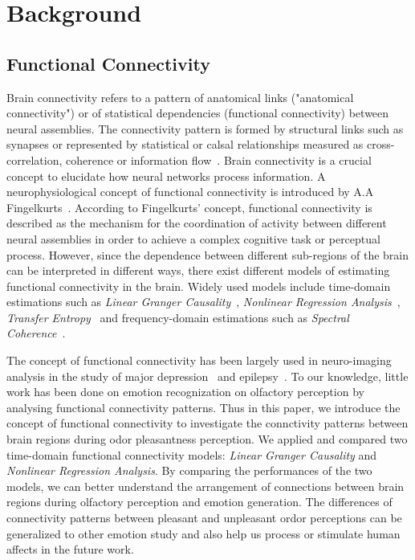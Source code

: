 \section{Background}

\subsection{Functional Connectivity}
Brain connectivity refers to a pattern of anatomical links ("anatomical connectivity") or of statistical dependencies (functional connectivity) between neural assemblies. The connectivity pattern is formed by structural links such as synapses or represented by statistical or calsal relationships measured as cross-correlation, coherence or information flow~\cite{sporns2007brain}. Brain connectivity is a crucial concept to elucidate how neural networks process information. 
A neurophysiological concept of functional connectivity is introduced by A.A Fingelkurts~\cite{fingelkurts2005functional}. According to Fingelkurts' concept, functional connectivity is described as the mechanism for the coordination of activity between different neural assemblies in order to achieve a complex cognitive task or perceptual process. However, since the dependence between different sub-regions of the brain can be interpreted in different ways, there exist different models of estimating functional connectivity in the brain. Widely used models include time-domain estimations such as \emph{Linear Granger Causality}~\cite{granger1969investigating}, \emph{Nonlinear Regression Analysis}~\cite{pijn1990localization}, \emph{Transfer Entropy}~\cite{schreiber2000measuring} and frequency-domain estimations such as \emph{Spectral Coherence}~\cite{sun2004measuring}.

The concept of functional connectivity has been largely used in neuro-imaging analysis in the study of major depression~\cite{greicius2007resting} and epilepsy~\cite{waites2006functional}. To our knowledge, little work has been done on emotion recognization on olfactory perception by analysing functional connectivity patterns. Thus in this paper, we introduce the concept of functional connectivity to investigate the connctivity patterns between brain regions during odor pleasantness perception. We applied and compared two time-domain functional connectivity models: \emph{Linear Granger Causality} and \emph{Nonlinear Regression Analysis}. By comparing the performances of the two models, we can better understand the arrangement of connections between brain regions during olfactory perception and emotion generation. The differences of connectivity patterns between pleasant and unpleasant ordor perceptions can be generalized to other emotion study and also help us process or stimulate human affects in the future work. 


